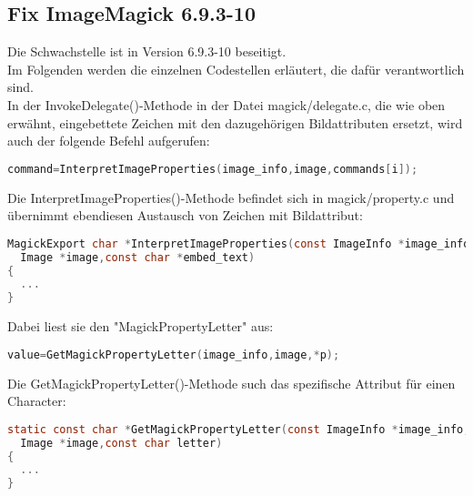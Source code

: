 \subsection{Fix ImageMagick 6.9.3-10}\label{subsec:fix-imagemagick-6.9.3-10}

Die Schwachstelle ist in Version 6.9.3-10 beseitigt.\\
Im Folgenden werden die einzelnen Codestellen erläutert, die dafür verantwortlich sind.\\

In der InvokeDelegate()-Methode in der Datei magick/delegate.c, die wie oben erwähnt, eingebettete Zeichen mit den dazugehörigen Bildattributen ersetzt, wird auch der folgende Befehl aufgerufen:\\

\begin{lstlisting}[firstnumber=1295, language=C, caption=magick/delegate.c Aufruf InterpretImageProperties(),label={lst:lstlisting}]
command=InterpretImageProperties(image_info,image,commands[i]);
\end{lstlisting}
\vspace{5mm}

Die InterpretImageProperties()-Methode befindet sich in magick/property.c und übernimmt ebendiesen Austausch von Zeichen mit Bildattribut:\\

\begin{lstlisting}[firstnumber=3347, language=C, caption=magick/property.c InterpretImageProperties(),label={lst:lstlisting}]
MagickExport char *InterpretImageProperties(const ImageInfo *image_info,
  Image *image,const char *embed_text)
{
  ...
}
\end{lstlisting}
\vspace{5mm}

Dabei liest sie den "MagickPropertyLetter" aus:\\

\begin{lstlisting}[firstnumber=3466, language=C, caption=magick/property.c Aufruf GetMagickPropertyLetter(),label={lst:lstlisting}]
  value=GetMagickPropertyLetter(image_info,image,*p);
\end{lstlisting}
\vspace{5mm}

Die GetMagickPropertyLetter()-Methode such das spezifische Attribut für einen Character:\\

\begin{lstlisting}[firstnumber=2343, language=C, caption=magick/property.c GetMagickPropertyLetter(),label={lst:lstlisting}]
static const char *GetMagickPropertyLetter(const ImageInfo *image_info,
  Image *image,const char letter)
{
  ...
}
\end{lstlisting}
\vspace{5mm}

